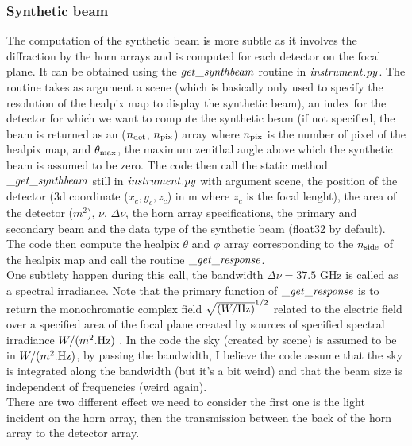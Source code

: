 \documentclass[a4paper, 11pt]{article}
\begin{document}
\subsubsection{Synthetic beam}




The computation of the synthetic beam is more subtle as it involves the diffraction by the horn arrays and is computed for each detector on the focal plane.
It can be obtained using the $\it{get\_synthbeam}$ routine in $\it{instrument.py}$. The routine takes as argument a scene (which is basically only used to specify the resolution of the healpix map to display the synthetic beam), an index for the detector for which we want to compute the synthetic beam (if not specified, the beam is returned as an ($n_{\rm det}$, $n_{\rm pix}$) array where  $n_{\rm pix}$ is the number of pixel of the healpix map, and $\theta_{\rm max}$, the maximum zenithal angle above which the synthetic beam is assumed to be zero. The code then call the static method $\it{\_get\_synthbeam}$ still in $\it{instrument.py}$ with argument scene, the position of the detector (3d coordinate ($x_{c},y_{c},z_{c}$) in m where $z_{c}$ is the  focal lenght), the area of the detector ($m^{2}$), $\nu$, $\Delta \nu$, the horn array specifications, the primary and secondary beam and the data type of the synthetic beam (float32 by default).
The code then compute the healpix $\theta$ and $\phi$ array corresponding to the $n_{\rm side}$ of the healpix map and call the routine $\it{\_get\_response}$. \\

One subtlety happen during this call, the bandwidth  $\Delta \nu= 37.5$ GHz is called as a spectral irradiance. Note that the primary function of $\it{\_get\_response}$ is to return the monochromatic complex field $\sqrt{(W/ {\rm Hz})}^{1/2}$ related to the electric field over a specified area of the focal plane created by sources of specified spectral irradiance $W/(m^{2}.{\rm Hz} )$ . In the code the sky (created by scene) is assumed to be in $W/(m^{2}.{\rm Hz} )$, by passing the bandwidth, I believe the code assume that the sky is integrated along the bandwidth (but it's a bit weird) and that the beam size is independent of frequencies (weird again). \\

There are two different effect we need to consider the first one is the light incident on the horn array, then the transmission between the back of the horn array to the detector array.
\end{document}
